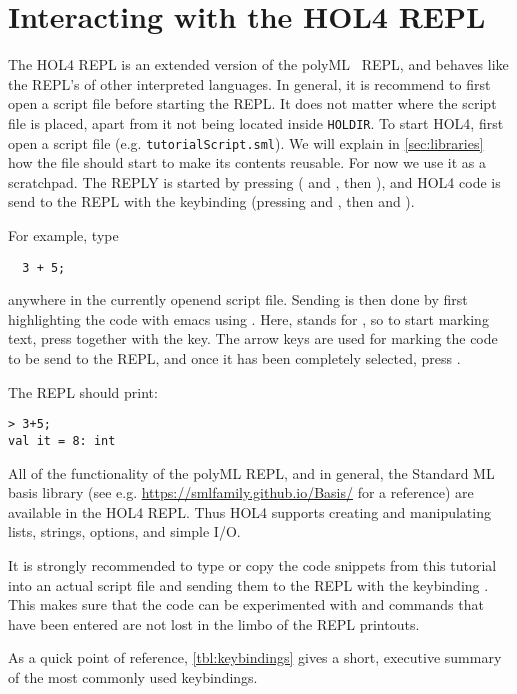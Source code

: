 \section{Interacting with the HOL4 REPL}

The HOL4 REPL is an extended version of the polyML~\cite{polymlweb} REPL, and
behaves like the REPL's of other interpreted languages.
In general, it is recommend to first open a script file before starting
the REPL.
It does not matter where the script file is placed, apart from it not being
located inside \texttt{HOLDIR}. To start HOL4, first open a script file (e.g. \texttt{tutorialScript.sml}).
We will explain in \autoref{sec:libraries} how the file should start to make its
contents reusable. For now we use it as a scratchpad.
The REPLY is started by pressing  ( and , then ),
and HOL4 code is send to the REPL with the keybinding 
(pressing  and , then  and ).

For example, type
\begin{lstlisting}
  3 + 5;
\end{lstlisting}

anywhere in the currently openend script file.
Sending is then done by first highlighting the code with emacs using .
Here,  stands for , so to start marking text, press
 together with the  key.
The arrow keys are used for marking the code to be send to the REPL, and once it
has been completely selected, press .

The REPL should print:
\begin{lstlisting}[frame=single]
> 3+5;
val it = 8: int
\end{lstlisting}

All of the functionality of the polyML REPL, and in general, the Standard ML
basis library (see e.g. \url{https://smlfamily.github.io/Basis/} for a reference)
are available in the HOL4 REPL.
Thus HOL4 supports creating and manipulating lists, strings, options, and
simple I/O.

It is strongly recommended to type or copy the code snippets from this tutorial
into an actual script file and sending them to the REPL with the keybinding .
This makes sure that the code can be experimented with and commands that have
been entered are not lost in the limbo of the REPL printouts.

As a quick point of reference, \autoref{tbl:keybindings} gives a short,
executive summary of the most commonly used keybindings.

